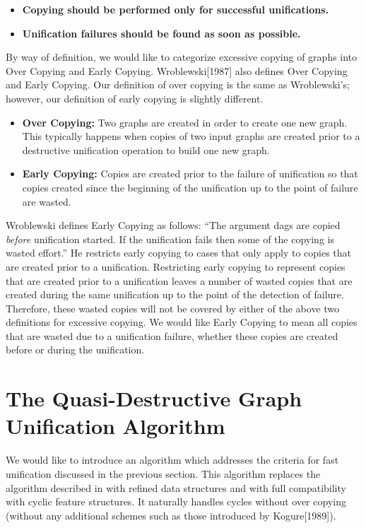 \begin{itemize}
\item {\bf Copying should be performed only for successful
unifications.}
\item {\bf Unification failures should be found as soon as possible.}
\end{itemize}

By way of definition, we would like to categorize excessive
copying of graphs into Over Copying and Early Copying. 
Wroblewski[1987] also defines Over Copying and Early Copying. Our
definition of over copying is the same as Wroblewski's; however,
our definition of early copying is slightly different.

\begin{itemize}

\item {\bf Over Copying:} Two graphs are created in order to
create one new graph. This typically happens when copies of
two input graphs are created prior to a destructive
unification operation to build one new graph.

\item {\bf Early Copying:} Copies are created prior to the
failure of unification so that copies created since the
beginning of the unification up to the point of
failure are wasted. 

\end{itemize}

Wroblewski defines Early Copying as follows: ``The argument dags are
copied {\it before} unification started. If the unification fails then
some of the copying is wasted effort.'' He restricts early copying to
cases that only apply to copies that are created prior to a
unification.  Restricting early copying to represent copies that are
created prior to a unification leaves a number of wasted copies that are
created during the same unification up to the point of the detection
of failure. Therefore, these wasted copies will not be covered by
either of the above two definitions for excessive copying.  We would
like Early Copying to mean all copies that are wasted due to a
unification failure, whether these copies are created before or during
the unification.



\section{The Quasi-Destructive Graph Unification Algorithm}

We would like to introduce an algorithm which addresses the criteria
for fast unification discussed in the previous section. This algorithm
replaces the algorithm described in \cite{quasi} with refined data
structures and with full compatibility with cyclic feature structures.
It naturally handles cycles without over copying (without any
additional schemes such as those introduced by Kogure[1989]).

